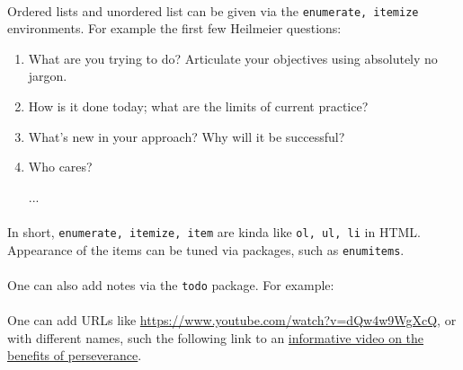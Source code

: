 \paragraph{}Ordered lists and unordered list can be given via the \texttt{enumerate, itemize} environments. For example the first few Heilmeier questions:
\begin{enumerate}[label=(\arabic*)]
    \item What are you trying to do? Articulate your objectives using absolutely no jargon.
    \item How is it done today; what are the limits of current practice?
    \item What's new in your approach? Why will it be successful?
    \item Who cares?
    \item[...]
\end{enumerate}
\paragraph{}In short, \texttt{enumerate, itemize, item} are kinda like \texttt{ol, ul, li} in HTML. Appearance of the items can be tuned via packages, such as \texttt{enumitems}.
\paragraph{}One can also add notes via the \texttt{todo} package. For example: 
\paragraph{}One can add URLs like \url{https://www.youtube.com/watch?v=dQw4w9WgXcQ}, or with different names, such the following link to an \href{https://www.youtube.com/watch?v=dQw4w9WgXcQ}{informative video on the benefits of perseverance}.
